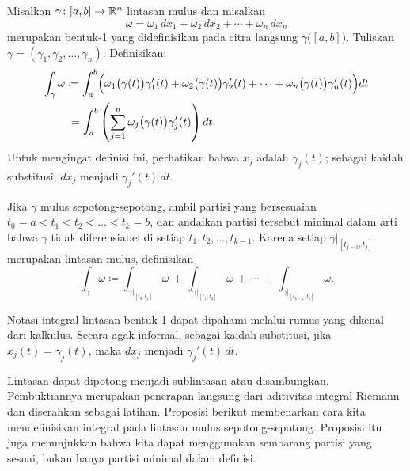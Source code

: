 \begin{defn}
Misalkan $\gamma \colon [a,b] \to {\mathbb{R}}^n$ lintasan mulus
dan misalkan
\begin{equation*}
\omega = \omega_1 \,dx_1 + \omega_2 \,dx_2 + \cdots + \omega_n \,dx_n
\end{equation*}
merupakan bentuk-1 yang didefinisikan pada citra langsung $\gamma\bigl([a,b]\bigr)$.
Tuliskan $\gamma = (\gamma_1,\gamma_2,\ldots,\gamma_n)$.
Definisikan:
\begin{equation*}
\begin{split}
\int_{\gamma} \omega
& \coloneqq
\int_a^b 
\Bigl(
\omega_1\bigl(\gamma(t)\bigr) \gamma_1'(t) +
\omega_2\bigl(\gamma(t)\bigr) \gamma_2'(t) + \cdots +
\omega_n\bigl(\gamma(t)\bigr) \gamma_n'(t) \Bigr) dt
\\
&\phantom{:}=
\int_a^b 
\left(
\sum_{j=1}^n
\omega_j\bigl(\gamma(t)\bigr) \gamma_j'(t) \right) dt .
\end{split}
\end{equation*}
Untuk mengingat definisi ini, perhatikan bahwa $x_j$ adalah $\gamma_j(t)$; sebagai
kaidah substitusi, $dx_j$ menjadi $\gamma_j'(t) \, dt$.

Jika $\gamma$ mulus sepotong-sepotong, ambil partisi yang bersesuaian
$t_0 = a < t_1 < t_2 < \ldots < t_k = b$, dan andaikan partisi tersebut
minimal
dalam arti bahwa $\gamma$ tidak diferensiabel
di setiap $t_1,t_2,\ldots,t_{k-1}$.  Karena setiap $\gamma|_{[t_{j-1},t_j]}$
merupakan lintasan mulus, definisikan
\begin{equation*}
\int_{\gamma} \omega
\coloneqq
\int_{\gamma|_{[t_0,t_1]}} \omega
\,
+
\,
\int_{\gamma|_{[t_1,t_2]}} \omega
\,
+ \, \cdots \, + \,
\int_{\gamma|_{[t_{k-1},t_k]}} \omega .
\end{equation*}
\end{defn}

Notasi integral lintasan bentuk-1 dapat dipahami melalui rumus
 yang dikenal dari kalkulus.
Secara agak informal, sebagai kaidah substitusi,
jika $x_j(t) = \gamma_j(t)$, maka $dx_j$ menjadi $\gamma_j'(t) \, dt$.

Lintasan dapat dipotong menjadi sublintasan atau disambungkan.  Pembuktiannya merupakan penerapan langsung
dari aditivitas integral Riemann dan diserahkan sebagai latihan.
Proposisi berikut membenarkan cara kita mendefinisikan integral pada lintasan
mulus sepotong-sepotong.  Proposisi itu juga menunjukkan bahwa kita dapat
menggunakan sembarang partisi yang sesuai, bukan hanya partisi minimal dalam definisi.

